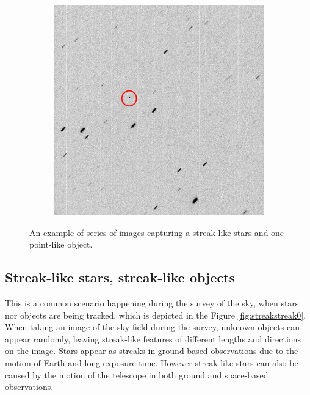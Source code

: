 \begin{figure}[!h]
\begin{subfigure}{.3\textwidth}
        \label{fig:streakpoint2}
    \end{subfigure}
    \hfill
    \begin{subfigure}{.3\textwidth}
        \centering
        \includegraphics[width=\textwidth]{images/StreakPoint3.png}
        \label{fig:streakpoint3}
    \end{subfigure}
    \hfill
    \caption{An example of series of images capturing a streak-like stars and one point-like object. }
    \label{fig:streakpoint0}
\end{figure}

\subsection{Streak-like stars, streak-like objects}
This is a common scenario happening during the survey of the sky, when stars nor objects are being tracked, which is depicted in the Figure \ref{fig:streakstreak0}. When taking an image of the sky field during the survey, unknown objects can appear randomly, leaving streak-like features of different lengths and directions on the image. 
Stars appear as streaks in ground-based observations due to the motion of Earth and long exposure time. However streak-like stars can also be caused by the motion of the telescope in both ground and space-based observations. 

